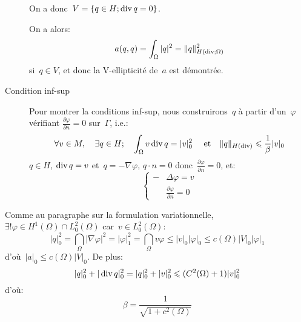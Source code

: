 \begin{description}
On a donc~$V=\left\{ q\in H; \operatorname{div} q=0\right\}$.

On a alors:
\begin{equation}a(q,q)=\displaystyle\int_\Omega |q|^2 = \|q\|^2_{H(\operatorname{div};\Omega)}\end{equation} si~$q\in V$, et
donc la V-ellipticité de~$a$ est démontrée.

\medskip
\item[Condition inf-sup]
Pour montrer la conditions inf-sup, nous construirons~$q$ à partir d'un~$\varphi$ vérifiant
$\frac{\partial\varphi}{\partial n}=0$ sur~$\Gamma$, i.e.:
\begin{equation}
\forall v\in M,\quad \exists q\in H;\quad \displaystyle\int_\Omega v \operatorname{div} q = |v|_0^2 \quad\text{ et}\quad
\|q\|_{H(\operatorname{div})}\leqslant \frac1\beta |v|_0
\end{equation}
$q\in H$, $\operatorname{div} q=v$ et~$q=-\nabla\varphi$, $q\cdot n=0$ donc~$\frac{\partial\varphi}{\partial n}=0$,
et:
\begin{equation}\left\{
\begin{aligned}
-&\Delta \varphi = v\\
&\frac{\partial \varphi}{\partial n}=0
\end{aligned}
\right.
\end{equation}
\end{description}
Comme au paragraphe sur la formulation variationnelle, $\exists!\varphi\in H^1(\Omega)\cap L^2_0(\Omega)$
car~$v\in L^2_0(\Omega)$:
\begin{equation}
|q|_0^2=\dint_\Omega |\nabla \varphi|^2 = |\varphi|_1^2 = \dint_\Omega v\varphi \le |v|_0 |\varphi|_0
\le c(\Omega) |V|_0 |\varphi|_1\end{equation} d'où~$|a|_0\le c(\Omega) |V|_0$. De plus:
\begin{equation}|q|_0^2+|\operatorname{div} q|_0^2 = |q|_0^2+|v|_0^2 \leqslant (C^2(\Omega)+1)|v|_0^2\end{equation}
d'où:
\begin{equation}\beta = \frac1{\sqrt{1+c^2(\Omega)}}\end{equation}

\medskip
{}




